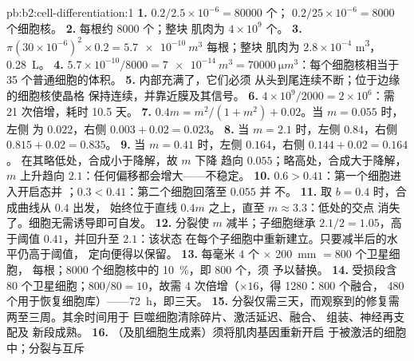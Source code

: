 \begin{solution}{pb:b2:cell-differentiation:1}
\textbf{1.} $0.2/2.5\times 10^{-6} = \num{80000}$ 个；
$0.2/25\times 10^{-6} = \num{8000}$ 个细胞核。
\textbf{2.} 每根约 \num{8000} 个；整块
肌肉为 $4\times 10^{9}$ 个。
\textbf{3.} $\pi(30\times 10^{-6})^{2}\times 0.2 = \qty{5.7e-10}{m^3}$
每根；整块
肌肉为 $2.8\times 10^{-4}$ \unit{m^3}，\qty{0.28}{L}。
\textbf{4.} $5.7\times 10^{-10}/8000 = \qty{7e-14}{m^3} =
\qty{70000}{\micro m^3}$：每个细胞核相当于 35 个普通细胞的体积。
\textbf{5.} 内部充满了，它们必须
从头到尾连续不断；位于边缘的细胞核使晶格
保持连续，并靠近膜及其信号。
\textbf{6.} $4\times 10^{9}/2000 = 2\times 10^{6}$：需 21 次倍增，耗时 10.5
天。
\textbf{7.} $0.4m = m^{2}/(1 + m^{2}) + 0.02$。当 $m = 0.055$ 时，左侧
为 $0.022$，右侧 $0.003 + 0.02 = 0.023$。
\textbf{8.} 当 $m = 2.1$ 时，左侧 $0.84$，右侧 $0.815 + 0.02 = 0.835$。
\textbf{9.} 当 $m = 0.41$ 时，左侧 $0.164$，右侧 $0.144 + 0.02 = 0.164$。
在其略低处，合成小于降解，故 $m$ 下降
趋向 $0.055$；略高处，合成大于降解，$m$
上升趋向 $2.1$：任何偏移都会增大——不稳定。
\textbf{10.} $0.6 > 0.41$：第一个细胞进入开启态并
；$0.3 < 0.41$：第二个细胞回落至 $0.055$ 并
不。
\textbf{11.} 取 $b = 0.4$ 时，合成曲线从 $0.4$ 出发，
始终位于直线 $0.4m$ 之上，直至 $m \approx 3.3$：低处的交点
消失了。细胞无需诱导即可自发。
\textbf{12.} 分裂使 $m$ 减半；子细胞继承 $2.1/2 =
1.05$，高于阈值 $0.41$，并回升至 $2.1$：该状态
在每个子细胞中重新建立。只要减半后的水平仍高于阈值，
定向便得以保留。
\textbf{13.} 每毫米 $4$ 个 $\times$ \qty{200}{mm} $= 800$ 个卫星细胞，
每根；\num{8000} 个细胞核中的 \qty{10}{\%}，即 \num{800} 个，须
予以替换。
\textbf{14.} 受损段含 $80$ 个卫星细胞；$800/80 =
10$，故需 4 次倍增（$\times 16$，得 \num{1280}：800 个融合，
480 个用于恢复细胞库）——\qty{72}{h}，即三天。
\textbf{15.} 分裂仅需三天，而观察到的修复需两至三周。其余时间用于
巨噬细胞清除碎片、激活延迟、融合、
组装、神经再支配及
新段成熟。
\textbf{16.} （及肌细胞生成素）须将肌肉基因重新开启
于被激活的细胞中；分裂与互斥

\end{solution}
